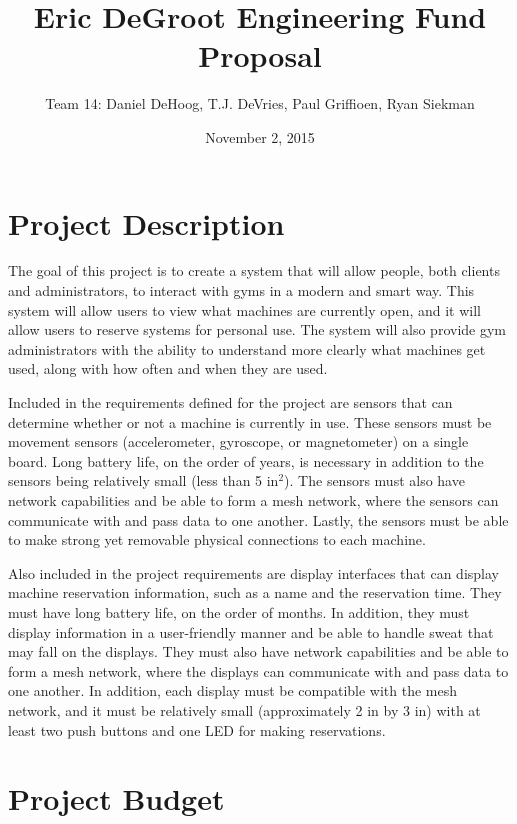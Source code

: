 \documentclass[11pt, oneside]{article}   	%
\title{Eric DeGroot Engineering Fund Proposal}
\author{Team 14: Daniel DeHoog, T.J. DeVries, Paul Griffioen, Ryan Siekman}
\date{November 2, 2015}							%
\begin{document}
\maketitle
\section{Project Description}

The goal of this project is to create a system that will allow people, both clients and administrators, to interact with gyms in a modern and smart way. This system will allow users to view what machines are currently open, and it will allow users to reserve systems for personal use. The system will also provide gym administrators with the ability to understand more clearly what machines get used, along with how often and when they are used.

Included in the requirements defined for the project are sensors that can determine whether or not a machine is currently in use. These sensors must be movement sensors (accelerometer, gyroscope, or magnetometer) on a single board. Long battery life, on the order of years, is necessary in addition to the sensors being relatively small (less than 5 in$^2$). The sensors must also have network capabilities and be able to form a mesh network, where the sensors can communicate with and pass data to one another. Lastly, the sensors must be able to make strong yet removable physical connections to each machine.

Also included in the project requirements are display interfaces that can display machine reservation information, such as a name and the reservation time. They must have long battery life, on the order of months. In addition, they must display information in a user-friendly manner and be able to handle sweat that may fall on the displays. They must also have network capabilities and be able to form a mesh network, where the displays can communicate with and pass data to one another. In addition, each display must be compatible with the mesh network, and it must be relatively small (approximately 2 in by 3 in) with at least two push buttons and one LED for making reservations.

\section{Project Budget}
\end{document}
